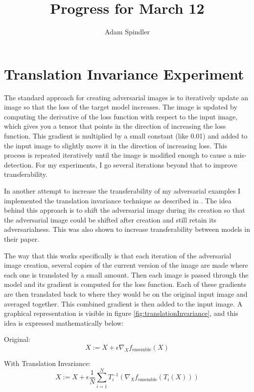 \documentclass{article}
\title{Progress for March 12}
\author{Adam Spindler}
\begin{document}
\maketitle

\section{Translation Invariance Experiment}


The standard approach for creating adversarial images is to iteratively update an image so that the loss of the target model increases. The image is updated by computing the derivative of the loss function with respect to the input image, which gives you a tensor that points in the direction of increasing the loss function. This gradient is multiplied by a small constant (like 0.01) and added to the input image to slightly move it in the direction of increasing loss. This process is repeated iteratively until the image is modified enough to cause a mis-detection. For my experiments, I go several iterations beyond that to improve transferability.

In another attempt to increase the transferability of my adversarial examples I implemented the translation invariance technique as described in \cite{dong2019evading}. The idea behind this approach is to shift the adversarial image during its creation so that the adversarial image could be shifted after creation and still retain its adversarialness. This was also shown to increase transferability between models in their paper.

The way that this works specifically is that each iteration of the adversarial image creation, several copies of the current version of the image are made where each one is translated by a small amount. Then each image is passed through the model and its gradient is computed for the loss function. Each of these gradients are then translated back to where they would be on the original input image and averaged together. This combined gradient is then added to the input image. A graphical representation is visible in figure \ref{fig:translationInvariance}, and this idea is expressed mathematically below:
\vspace{0.5cm}

Original:
\begin{equation}
    X := X + \epsilon \nabla_X f_\text{ensemble}(X) 
\end{equation}

With Translation Invariance:
\begin{equation}
    X := X + \epsilon \frac{1}{N} \sum_{i = 1}^{N} T_i^{-1}(\nabla_X f_\text{ensemble}(T_i(X)))
\end{equation}
\end{document}
